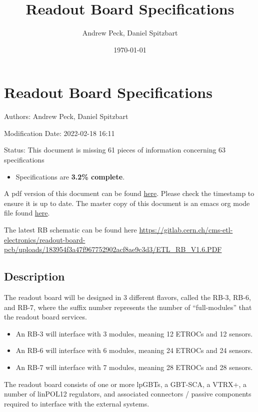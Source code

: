 \documentclass[11pt]{article}
\author{Andrew Peck, Daniel Spitzbart}
\date{\today}
\title{Readout Board Specifications}
\begin{document}
\maketitle

\section{Readout Board Specifications}
\label{sec:org0345d13}

Authors: Andrew Peck, Daniel Spitzbart

Modification Date: 2022-02-18 16:11

Status: This document is missing 61 pieces of information concerning  63 specifications
\begin{itemize}
\item Specifications are \textbf{3.2\% complete}.
\end{itemize}

A pdf version of this document can be found \href{./rb-specs.pdf}{here}. Please check the timestamp to ensure it is up to date. The master copy of this document is an emacs org mode file found \href{https://gitlab.cern.ch/cms-etl-electronics/readout-board-docs/-/blob/master/docs/Specifications/rb-specs.org}{here}.

The latest RB schematic can be found here \url{https://gitlab.cern.ch/cms-etl-electronics/readout-board-pcb/uploads/183954f3a47f967752902acf8ae9c3d3/ETL\_RB\_V1.6.PDF}

\setcounter{tocdepth}{3}
\tableofcontents

\subsection{Description}
\label{sec:org33dbebe}

The readout board will be designed in 3 different flavors, called the RB-3, RB-6, and RB-7, where the suffix number represents the number of ``full-modules'' that the readout board services.

\begin{itemize}
\item An RB-3 will interface with 3 modules, meaning 12 ETROCs and 12 sensors.
\item An RB-6 will interface with 6 modules, meaning 24 ETROCs and 24 sensors.
\item An RB-7 will interface with 7 modules, meaning 28 ETROCs and 28 sensors.
\end{itemize}

The readout board consists of one or more lpGBTs, a GBT-SCA, a VTRX+, a number of linPOL12 regulators, and associated connectors / passive components required to interface with the external systems.
\end{document}
